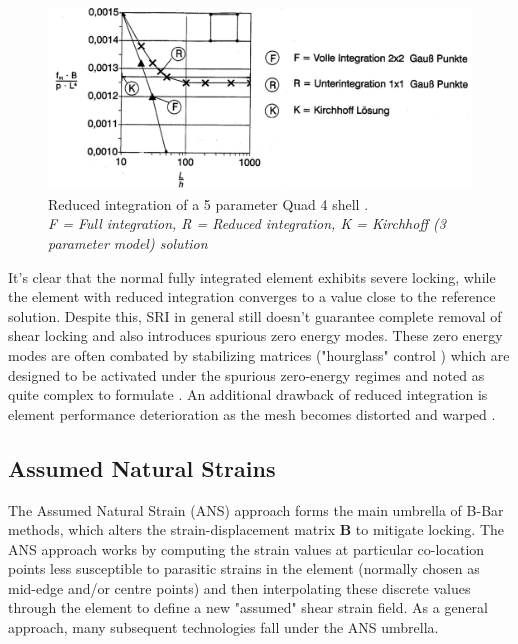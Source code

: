 \begin{figure}[H]
	\centering
	\def\svgwidth{\columnwidth}
	\includegraphics[width=14cm]{images/shearlockingredint.png}
	\caption[Reduced integration of a 5 parameter Quad 4 shell \cite{Bletz16}.]{Reduced integration of a 5 parameter Quad 4 shell \cite{Bletz16}.\\ \textit{F = Full integration, R = Reduced integration, K = Kirchhoff (3 parameter model) solution}}
	\label{shearlockingredint}
\end{figure}

It's clear that the normal fully integrated element exhibits severe locking, while the element with reduced integration converges to a value close to the reference solution. Despite this, SRI in general still doesn't guarantee complete removal of shear locking and also introduces spurious zero energy modes. These zero energy modes are often combated by stabilizing matrices ("hourglass" control \cite{Zien2Vol2000}) which are designed to be activated under the spurious zero-energy regimes and noted as quite complex to formulate \cite{Mohan97}. An additional drawback of reduced integration is element performance deterioration as the mesh becomes distorted and warped \cite{Nguyen2009} \cite{Yang2000}.

\subsection{Assumed Natural Strains}

The Assumed Natural Strain (ANS) approach forms the main umbrella of B-Bar methods, which alters the strain-displacement matrix $\mathbf{B}$ to mitigate locking. The ANS approach \cite{MACNEAL1982} works by computing the strain values at particular co-location points less susceptible to parasitic strains in the element (normally chosen as mid-edge and/or centre points) and then interpolating these discrete values through the element to define a new "assumed" shear strain field. As a general approach, many subsequent technologies fall under the ANS umbrella.


